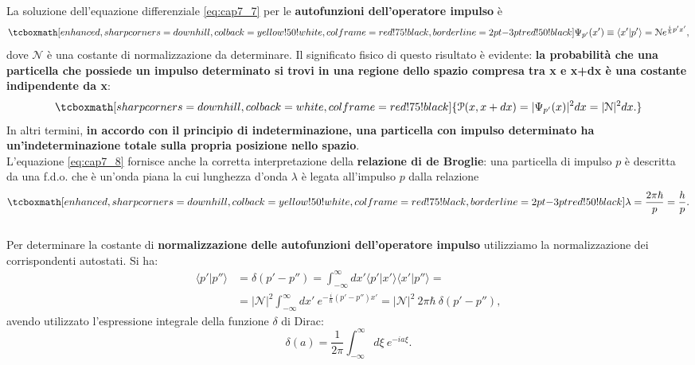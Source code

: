 \documentclass[a4paper,12pt,oneside]{book}
\begin{document}
La soluzione dell'equazione differenziale \eqref{eq:cap7_7} per le \textbf{autofunzioni dell'operatore impulso} è
	\begin{equation}
		\label{eq:cap7_8}
		\tcboxmath[enhanced,sharp corners=downhill ,colback=yellow!50!white,colframe=red!75!black, borderline={2pt}{-3pt}{red!50!black}]{
			\Psi_{p'}(x') \equiv \langle x' | p' \rangle = \mathcal{N} e^{\frac{i}{\hbar}p'x'},
			}
	\end{equation}
dove $\mathcal{N}$ è una costante di normalizzazione da determinare. Il significato fisico di questo risultato è evidente: \textbf{la probabilità che una particella che possiede un impulso determinato si trovi in una regione dello spazio compresa tra x e x+dx è una costante indipendente da x}:
	\begin{equation}
		\tcboxmath[sharp corners=downhill ,colback=white,colframe=red!75!black]{
			\mathcal{P}(x,x+dx) = |\Psi_{p'}(x)|^2 dx = |\mathcal{N}|^2 dx.
			}
	\end{equation}
\noindent In altri termini, \textbf{in accordo con il principio di indeterminazione, una particella con impulso determinato ha un'indeterminazione totale sulla propria posizione nello spazio}.\\

L'equazione \eqref{eq:cap7_8} fornisce anche la corretta interpretazione della \textbf{relazione di de Broglie}: una particella di impulso $p$ è descritta da una f.d.o. che è un'onda piana la cui lunghezza d'onda $\lambda$ è legata all'impulso $p$ dalla relazione
	\begin{equation}
		\tcboxmath[enhanced,sharp corners=downhill ,colback=yellow!50!white,colframe=red!75!black, borderline={2pt}{-3pt}{red!50!black}]{
			\lambda = \frac{2 \pi \hbar}{p} = \frac{h}{p}.
			}
	\end{equation}\\
	
Per determinare la costante di \textbf{normalizzazione delle autofunzioni dell'operatore impulso} utilizziamo la normalizzazione dei corrispondenti autostati. Si ha:
	\begin{align}
		\langle p'\vert p'' \rangle &= \delta \left( p' -p''\right) =\int _{-\infty}	 ^{\infty} dx' \langle p' \vert x' \rangle \langle x' \vert p'' \rangle = \nonumber \\
		&= \vert\mathcal{N} \vert ^2 \int _{-\infty}	 ^{\infty} dx' \ e^{-\frac{i}{\hbar} \left( p'-p''\right) x'} = \vert\mathcal{N} \vert ^2\ 2 \pi \hbar\ \delta\left(p' -p'' \right),
	\end{align}
avendo utilizzato l'espressione integrale della funzione $\delta$ di Dirac:
	\begin{equation}
		\delta \left( a \right) =\frac{1}{2\pi}\int _{-\infty} ^{\infty} d\xi \ e^{-ia\xi}.
	\end{equation}\\
\end{document}
